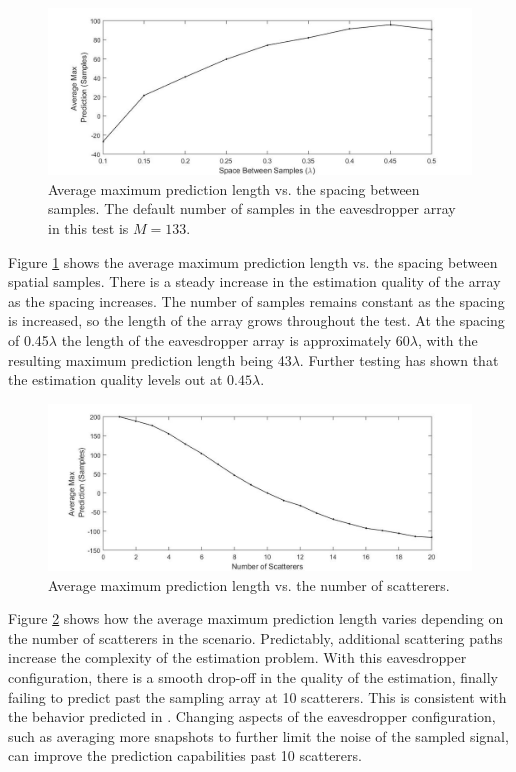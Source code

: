 \documentclass{allertonproc}
\begin{document}
\begin{figure}[tbp]
\begin{center}
\includegraphics[width=6in]{wavelengths.jpg}
\caption{Average maximum prediction length vs. the spacing between samples. The default number of samples in the eavesdropper array in this test is $M = 133$.}\label{spacing}
\end{center}
\end{figure}
Figure \ref{spacing} shows the average maximum prediction length vs. the spacing between spatial samples. There is a steady increase in the estimation quality of the array as the spacing increases. The number of samples remains constant as the spacing is increased, so the length of the array grows throughout the test. At the spacing of 0.45$\lambda$ the length of the eavesdropper array is approximately 60$\lambda$, with the resulting maximum prediction length being 43$\lambda$. Further testing has shown that the estimation quality levels out at $0.45\lambda$.

\begin{figure}[tbp]
\begin{center}
\includegraphics[width=6in]{numScatterers.jpg}
\caption{Average maximum prediction length vs. the number of scatterers.}\label{Scatter}
\end{center}
\end{figure}
Figure \ref{Scatter} shows how the average maximum prediction length varies depending on the number of scatterers in the scenario. Predictably, additional scattering paths increase the complexity of the estimation problem. With this eavesdropper configuration, there is a smooth drop-off in the quality of the estimation, finally failing to predict past the sampling array at 10 scatterers. This is consistent with the behavior predicted in \cite{kckpVTC2015}. Changing aspects of the eavesdropper configuration, such as averaging more snapshots to further limit the noise of the sampled signal, can improve the prediction capabilities past 10 scatterers.
\end{document}
